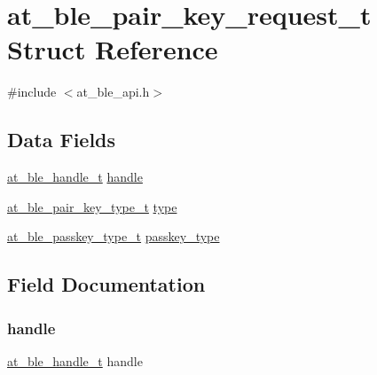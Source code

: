 \hypertarget{structat__ble__pair__key__request__t}{}\section{at\+\_\+ble\+\_\+pair\+\_\+key\+\_\+request\+\_\+t Struct Reference}
\label{structat__ble__pair__key__request__t}


{\ttfamily \#include $<$at\+\_\+ble\+\_\+api.\+h$>$}

\subsection*{Data Fields}
\begin{DoxyCompactItemize}
\item 
\mbox{\hyperlink{at__ble__api_8h_abd23646d0c662860741f787efc8456f2}{at\+\_\+ble\+\_\+handle\+\_\+t}} \mbox{\hyperlink{structat__ble__pair__key__request__t_ab8b0f353cb6a8d85f0822900e3b7cf35}{handle}}
\item 
\mbox{\hyperlink{at__ble__api_8h_a6b252fad20280faa8087d1a8776c09a0}{at\+\_\+ble\+\_\+pair\+\_\+key\+\_\+type\+\_\+t}} \mbox{\hyperlink{structat__ble__pair__key__request__t_ab3310bbf145c6be79b5d1cc2fe6dae76}{type}}
\item 
\mbox{\hyperlink{at__ble__api_8h_ac6a17bd067ca4c0bccbf4c87b164cc19}{at\+\_\+ble\+\_\+passkey\+\_\+type\+\_\+t}} \mbox{\hyperlink{structat__ble__pair__key__request__t_a4a9c2a8d7d04d98bd4fa540a62f87a3d}{passkey\+\_\+type}}
\end{DoxyCompactItemize}


\subsection{Field Documentation}
\mbox{\label{structat__ble__pair__key__request__t_ab8b0f353cb6a8d85f0822900e3b7cf35}} 
\subsubsection{\texorpdfstring{handle}{handle}}
{\footnotesize\ttfamily \mbox{\hyperlink{at__ble__api_8h_abd23646d0c662860741f787efc8456f2}{at\+\_\+ble\+\_\+handle\+\_\+t}} handle}

\mbox{\label{structat__ble__pair__key__request__t_a4a9c2a8d7d04d98bd4fa540a62f87a3d}} 
